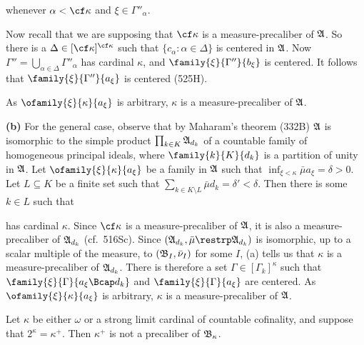 {\noindent whenever $\alpha<\cf\kappa$ and $\xi\in\Gamma''_{\alpha}$.

Now recall that we are supposing that $\cf\kappa$ is a
measure-precaliber of
$\frak A$.   So there is a $\Delta\in[\cf\kappa]^{\cf\kappa}$ such that
$\{c_{\alpha}:\alpha\in\Delta\}$ is centered in $\frak A$.   Now
$\Gamma''=\bigcup_{\alpha\in\Delta}\Gamma''_{\alpha}$ has cardinal
$\kappa$, and $\family{\xi}{\Gamma''}{b_{\xi}}$ is centered.   It
follows that $\family{\xi}{\Gamma''}{a_{\xi}}$ is
centered (525H).

As $\ofamily{\xi}{\kappa}{a_{\xi}}$ is arbitrary, $\kappa$ is a
measure-precaliber of $\frak A$.

\medskip

{\bf (b)} For the general case, observe that by Maharam's theorem (332B)
$\frak A$ is isomorphic to the simple product
$\prod_{k\in K}\frak A_{d_k}$ of a countable family of homogeneous
principal ideals, where $\family{k}{K}{d_k}$ is a partition of unity in
$\frak A$.   Let $\ofamily{\xi}{\kappa}{a_{\xi}}$ be a family in
$\frak A$ such that $\inf_{\xi<\kappa}\bar\mu a_{\xi}=\delta>0$.   Let
$L\subseteq K$ be a finite set such that
$\sum_{k\in K\setminus L}\bar\mu d_k=\delta'<\delta$.   Then there is
some $k\in L$ such that


\noindent has cardinal $\kappa$.   Since $\cf\kappa$ is a
measure-precaliber of $\frak A$, it is also a measure-precaliber of
$\frak A_{d_k}$ (cf.\ 516Sc).   Since
$(\frak A_{d_k},\bar\mu\restrp\frak A_{d_k})$ is isomorphic, up to a
scalar multiple of the measure, to $(\frak B_I,\bar\nu_I)$ for some $I$,
(a) tells us that $\kappa$ is a measure-precaliber of $\frak A_{d_k}$.
There is therefore a set $\Gamma\in[\Gamma_k]^{\kappa}$ such that
$\family{\xi}{\Gamma}{a_{\xi}\Bcap d_k}$ and
$\family{\xi}{\Gamma}{a_{\xi}}$ are centered.   As
$\ofamily{\xi}{\kappa}{a_{\xi}}$ is arbitrary, $\kappa$ is a
measure-precaliber of $\frak A$.
}%

Let $\kappa$ be either $\omega$ or a strong limit cardinal of countable
cofinality, and suppose that $2^{\kappa}=\kappa^+$.   Then $\kappa^+$ is
not a precaliber of $\frak B_{\kappa}$.



